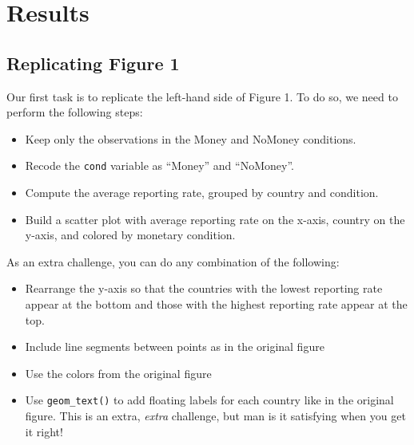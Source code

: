 \documentclass[12pt,halfline,a4paper,]{ouparticle}
\providecommand{\tightlist}{%
  \setlength{\itemsep}{0pt}\setlength{\parskip}{0pt}}
\begin{document}
\hypertarget{results}{%
\section{Results}\label{results}}

\hypertarget{replicating-figure-1}{%
\subsection{Replicating Figure 1}\label{replicating-figure-1}}

Our first task is to replicate the left-hand side of Figure 1. To do so,
we need to perform the following steps:

\begin{itemize}
\tightlist
\item
  Keep only the observations in the Money and NoMoney conditions.
\item
  Recode the \texttt{cond} variable as ``Money'' and ``NoMoney''.
\item
  Compute the average reporting rate, grouped by country and condition.
\item
  Build a scatter plot with average reporting rate on the x-axis,
  country on the y-axis, and colored by monetary condition.
\end{itemize}

\noindent As an extra challenge, you can do any combination of the
following:

\begin{itemize}
\tightlist
\item
  Rearrange the y-axis so that the countries with the lowest reporting
  rate appear at the bottom and those with the highest reporting rate
  appear at the top.
\item
  Include line segments between points as in the original figure
\item
  Use the colors from the original figure
\item
  Use \texttt{geom\_text()} to add floating labels for each country like
  in the original figure. This is an extra, \emph{extra} challenge, but
  man is it satisfying when you get it right!
\end{itemize}
\end{document}
